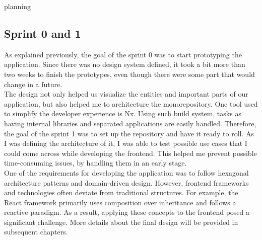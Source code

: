 planning\documentclass[../memory.tex]{subfiles}
\begin{document}
\subsection{Sprint 0 and 1}
As explained previously, the goal of the sprint 0 was to start prototyping the
application. Since there was no design system defined, it took a bit more than
two weeks to finish the prototypes, even though there were some part that would
change in a future.
\\
The design not only helped us visualize the entities and important parts of our
application, but also helped me to architecture the monorepository. One tool
used to simplify the developer experience is Nx. Using such build system, tasks
as having internal libraries and separated applications are easily handled.
Therefore, the goal of the sprint 1 was to set up the repository and have it
ready to roll. As I was defining the architecture of it, I was able to test
possible use cases that I could come across while developing the frontend. This
helped me prevent possible time-consuming issues, by handling them in an early
stage.
\\
One of the requirements for developing the application was to follow hexagonal
architecture patterns and domain-driven design. However, frontend frameworks and
technologies often deviate from traditional structures. For example, the React
framework primarily uses composition over inheritance and follows a reactive
paradigm. As a result, applying these concepts to the frontend posed a
significant challenge. More details about the final design will be provided in
subsequent chapters.
\end{document}
